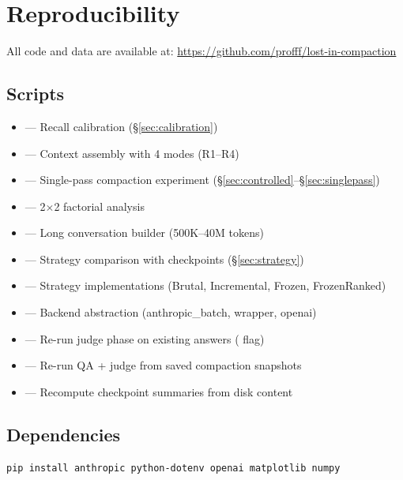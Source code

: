 \section{Reproducibility}
\label{sec:reproducibility}

All code and data are available at:
\url{https://github.com/profff/lost-in-compaction}

\subsection*{Scripts}
\begin{itemize}
  \item {} --- Recall calibration (\S\ref{sec:calibration})
  \item {} --- Context assembly with 4 modes (R1--R4)
  \item {} --- Single-pass compaction experiment (\S\ref{sec:controlled}--\S\ref{sec:singlepass})
  \item {} --- 2$\times$2 factorial analysis
  \item {} --- Long conversation builder (500K--40M tokens)
  \item {} --- Strategy comparison with checkpoints (\S\ref{sec:strategy})
  \item {} --- Strategy implementations (Brutal, Incremental, Frozen, FrozenRanked)
  \item {} --- Backend abstraction (anthropic\_batch, wrapper, openai)
  \item {} --- Re-run judge phase on existing answers ( flag)
  \item {} --- Re-run QA + judge from saved compaction snapshots
  \item {} --- Recompute checkpoint summaries from disk content
\end{itemize}

\subsection*{Dependencies}

\begin{lstlisting}[language=bash]
pip install anthropic python-dotenv openai matplotlib numpy
\end{lstlisting}

